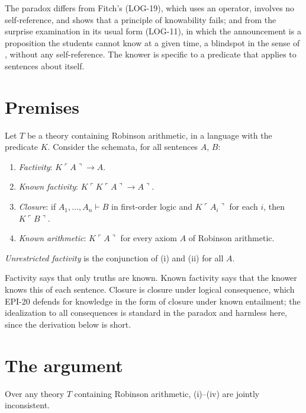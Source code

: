 \documentclass{situationist-preprint}
\begin{document}
The paradox differs from Fitch's (LOG-19), which uses an operator, involves no self-reference, and shows that a principle of knowability fails; and from the surprise examination in its usual form (LOG-11), in which the announcement is a proposition the students cannot know at a given time, a blindspot in the sense of \citet{Sorensen1988}, without any self-reference. The knower is specific to a predicate that applies to sentences about itself.

\section{Premises}

\begin{definition}\label{d:premises}
Let $T$ be a theory containing Robinson arithmetic, in a language with the predicate $K$. Consider the schemata, for all sentences $A$, $B$:
\begin{enumerate}[label=(\roman*)]
\item \emph{Factivity}: $K\ulcorner A\urcorner \rightarrow A$.
\item \emph{Known factivity}: $K\ulcorner K\ulcorner A\urcorner \rightarrow A\urcorner$.
\item \emph{Closure}: if $A_1, \ldots, A_n \vdash B$ in first-order logic and $K\ulcorner A_i\urcorner$ for each $i$, then $K\ulcorner B\urcorner$.
\item \emph{Known arithmetic}: $K\ulcorner A\urcorner$ for every axiom $A$ of Robinson arithmetic.
\end{enumerate}
\emph{Unrestricted factivity} is the conjunction of (i) and (ii) for all $A$.
\end{definition}

Factivity says that only truths are known. Known factivity says that the knower knows this of each sentence. Closure is closure under logical consequence, which EPI-20 defends for knowledge in the form of closure under known entailment; the idealization to all consequences is standard in the paradox and harmless here, since the derivation below is short.

\section{The argument}

\begin{theorem}\label{t:knower}
Over any theory $T$ containing Robinson arithmetic, (i)--(iv) are jointly inconsistent.
\end{theorem}
\end{document}
